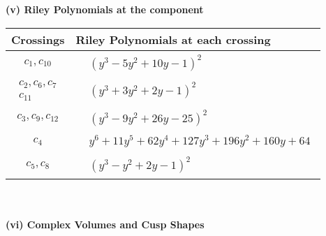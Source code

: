 \documentclass[1p]{elsarticle_modified}
\theoremstyle{definition}
\begin{document}
\newpage\renewcommand{\arraystretch}{1}
\flushleft \textbf{(v) Riley Polynomials at the component}\newline \\
\begin{tabular}{m{50pt}|m{274pt}}
Crossings & \hspace{64pt}Riley Polynomials at each crossing \\
\hline $$\begin{aligned}c_{1},c_{10}\end{aligned}$$&$\begin{aligned}
&(y^3-5 y^2+10 y-1)^2
\end{aligned}$\\
\hline $$\begin{aligned}c_{2},c_{6},c_{7}\\c_{11}\end{aligned}$$&$\begin{aligned}
&(y^3+3 y^2+2 y-1)^2
\end{aligned}$\\
\hline $$\begin{aligned}c_{3},c_{9},c_{12}\end{aligned}$$&$\begin{aligned}
&(y^3-9 y^2+26 y-25)^2
\end{aligned}$\\
\hline $$\begin{aligned}c_{4}\end{aligned}$$&$\begin{aligned}
&y^6+11 y^5+62 y^4+127 y^3+196 y^2+160 y+64
\end{aligned}$\\
\hline $$\begin{aligned}c_{5},c_{8}\end{aligned}$$&$\begin{aligned}
&(y^3- y^2+2 y-1)^2
\end{aligned}$\\
\hline
\end{tabular}\\~\\
\newpage\flushleft \textbf{(vi) Complex Volumes and Cusp Shapes}
\end{document}
